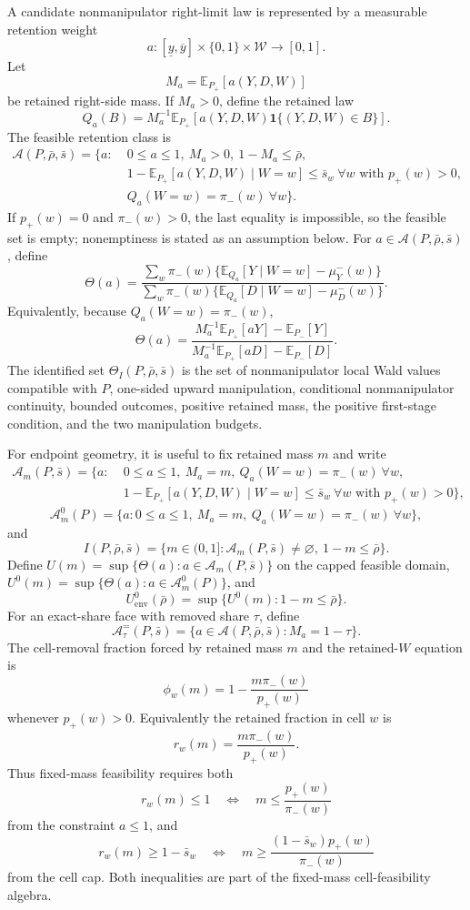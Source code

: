 \documentclass[11pt]{article}
\newcommand{\E}{\mathbb{E}}
\newcommand{\one}{\mathbf{1}}
\theoremstyle{definition}
\theoremstyle{plain}
\theoremstyle{remark}
\begin{document}
A candidate nonmanipulator right-limit law is represented by a measurable retention weight
\[
  a:[\underline y,\overline y]\times\{0,1\}\times\mathcal W\to[0,1].
\]
Let
\[
  M_a=\E_{P_+}[a(Y,D,W)]
\]
be retained right-side mass.  If \(M_a>0\), define the retained law
\[
  Q_a(B)=M_a^{-1}\E_{P_+}\!\left[a(Y,D,W)\one\{(Y,D,W)\in B\}\right].
\]
The feasible retention class is
\[
\begin{split}
  \mathcal A(P,\bar\rho,\bar s)=
  \bigl\{a:\;&0\le a\le1,\ M_a>0,\ 1-M_a\le\bar\rho,\\
  &1-\E_{P_+}[a(Y,D,W)\mid W=w]\le \bar s_w\ \forall w\text{ with }p_+(w)>0,\\
  &Q_a(W=w)=\pi_-(w)\ \forall w\bigr\}.
\end{split}
\]
If \(p_+(w)=0\) and \(\pi_-(w)>0\), the last equality is impossible, so the feasible set is
empty; nonemptiness is stated as an assumption below.  For \(a\in\mathcal A(P,\bar\rho,\bar s)\),
define
\[
  \Theta(a)=
  \frac{\sum_w \pi_-(w)\{\E_{Q_a}[Y\mid W=w]-\mu^-_Y(w)\}}
       {\sum_w \pi_-(w)\{\E_{Q_a}[D\mid W=w]-\mu^-_D(w)\}}.
\]
Equivalently, because \(Q_a(W=w)=\pi_-(w)\),
\[
  \Theta(a)=
  \frac{M_a^{-1}\E_{P_+}[aY]-\E_{P_-}[Y]}
       {M_a^{-1}\E_{P_+}[aD]-\E_{P_-}[D]}.
\]
The identified set \(\Theta_I(P,\bar\rho,\bar s)\) is the set of nonmanipulator local Wald
values compatible with \(P\), one-sided upward manipulation, conditional nonmanipulator
continuity, bounded outcomes, positive retained mass, the positive first-stage condition,
and the two manipulation budgets.

For endpoint geometry, it is useful to fix retained mass \(m\) and write
\[
\begin{split}
  \mathcal A_m(P,\bar s)=
  \bigl\{a:\;&0\le a\le1,\ M_a=m,\ Q_a(W=w)=\pi_-(w)\ \forall w,\\
  &1-\E_{P_+}[a(Y,D,W)\mid W=w]\le\bar s_w\ \forall w\text{ with }p_+(w)>0\bigr\},
\end{split}
\]
\[
  \mathcal A_m^0(P)=
  \{a:0\le a\le1,\ M_a=m,\ Q_a(W=w)=\pi_-(w)\ \forall w\},
\]
and
\[
  I(P,\bar\rho,\bar s)=
  \{m\in(0,1]:\mathcal A_m(P,\bar s)\neq\varnothing,\ 1-m\le\bar\rho\}.
\]
Define \(U(m)=\sup\{\Theta(a):a\in\mathcal A_m(P,\bar s)\}\) on the capped feasible
domain, \(U^0(m)=\sup\{\Theta(a):a\in\mathcal A_m^0(P)\}\), and
\[
  U^0_{\mathrm{env}}(\bar\rho)=\sup\{U^0(m):1-m\le\bar\rho\}.
\]
For an exact-share face with removed share \(\tau\), define
\[
  \mathcal A^{=}_\tau(P,\bar s)
  =
  \{a\in\mathcal A(P,\bar\rho,\bar s):M_a=1-\tau\}.
\]
The cell-removal fraction forced by retained mass \(m\) and the retained-\(W\) equation is
\[
  \phi_w(m)=1-\frac{m\pi_-(w)}{p_+(w)}
\]
whenever \(p_+(w)>0\).  Equivalently the retained fraction in cell \(w\) is
\[
  r_w(m)=\frac{m\pi_-(w)}{p_+(w)}.
\]
Thus fixed-mass feasibility requires both
\[
  r_w(m)\le1
  \quad\Longleftrightarrow\quad
  m\le \frac{p_+(w)}{\pi_-(w)}
\]
from the constraint \(a\le1\), and
\[
  r_w(m)\ge1-\bar s_w
  \quad\Longleftrightarrow\quad
  m\ge \frac{(1-\bar s_w)p_+(w)}{\pi_-(w)}
\]
from the cell cap.  Both inequalities are part of the fixed-mass cell-feasibility algebra.
\end{document}
